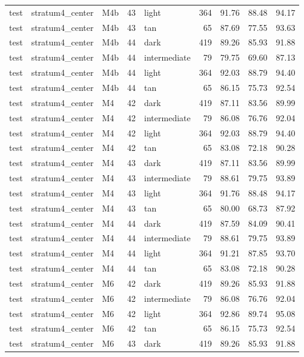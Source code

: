 \begin{tabular}{lllrlrrrr}
test & stratum4\_center & M4b & 43 & light & 364 & 91.76 & 88.48 & 94.17 \\
test & stratum4\_center & M4b & 43 & tan & 65 & 87.69 & 77.55 & 93.63 \\
test & stratum4\_center & M4b & 44 & dark & 419 & 89.26 & 85.93 & 91.88 \\
test & stratum4\_center & M4b & 44 & intermediate & 79 & 79.75 & 69.60 & 87.13 \\
test & stratum4\_center & M4b & 44 & light & 364 & 92.03 & 88.79 & 94.40 \\
test & stratum4\_center & M4b & 44 & tan & 65 & 86.15 & 75.73 & 92.54 \\
test & stratum4\_center & M4 & 42 & dark & 419 & 87.11 & 83.56 & 89.99 \\
test & stratum4\_center & M4 & 42 & intermediate & 79 & 86.08 & 76.76 & 92.04 \\
test & stratum4\_center & M4 & 42 & light & 364 & 92.03 & 88.79 & 94.40 \\
test & stratum4\_center & M4 & 42 & tan & 65 & 83.08 & 72.18 & 90.28 \\
test & stratum4\_center & M4 & 43 & dark & 419 & 87.11 & 83.56 & 89.99 \\
test & stratum4\_center & M4 & 43 & intermediate & 79 & 88.61 & 79.75 & 93.89 \\
test & stratum4\_center & M4 & 43 & light & 364 & 91.76 & 88.48 & 94.17 \\
test & stratum4\_center & M4 & 43 & tan & 65 & 80.00 & 68.73 & 87.92 \\
test & stratum4\_center & M4 & 44 & dark & 419 & 87.59 & 84.09 & 90.41 \\
test & stratum4\_center & M4 & 44 & intermediate & 79 & 88.61 & 79.75 & 93.89 \\
test & stratum4\_center & M4 & 44 & light & 364 & 91.21 & 87.85 & 93.70 \\
test & stratum4\_center & M4 & 44 & tan & 65 & 83.08 & 72.18 & 90.28 \\
test & stratum4\_center & M6 & 42 & dark & 419 & 89.26 & 85.93 & 91.88 \\
test & stratum4\_center & M6 & 42 & intermediate & 79 & 86.08 & 76.76 & 92.04 \\
test & stratum4\_center & M6 & 42 & light & 364 & 92.86 & 89.74 & 95.08 \\
test & stratum4\_center & M6 & 42 & tan & 65 & 86.15 & 75.73 & 92.54 \\
test & stratum4\_center & M6 & 43 & dark & 419 & 89.26 & 85.93 & 91.88 \\

\end{tabular}
